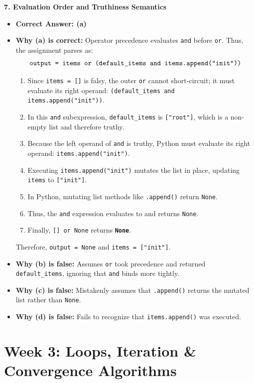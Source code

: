 \textbf{7. Evaluation Order and Truthiness Semantics}
\begin{itemize}
    \item \textbf{Correct Answer: (a)}
    \item \textbf{Why (a) is correct:}
    Operator precedence evaluates \texttt{and} before \texttt{or}. Thus, the assignment parses as:
    \begin{equation*}
    \text{\texttt{output = items or (default\_items and items.append("init"))}}
    \end{equation*}
    \begin{enumerate}
        \item Since \texttt{items = []} is falsy, the outer \texttt{or} cannot short-circuit; it must evaluate its right operand: \texttt{(default\_items and items.append("init"))}.
        \item In this \texttt{and} subexpression, \texttt{default\_items} is \texttt{["root"]}, which is a non-empty list and therefore truthy.
        \item Because the left operand of \texttt{and} is truthy, Python must evaluate its right operand: \texttt{items.append("init")}.
        \item Executing \texttt{items.append("init")} mutates the list in place, updating \texttt{items} to \texttt{["init"]}.
        \item In Python, mutating list methods like \texttt{.append()} return \texttt{None}.
        \item Thus, the \texttt{and} expression evaluates to and returns \texttt{None}.
        \item Finally, \texttt{[] or None} returns \textbf{\texttt{None}}.
    \end{enumerate}
    Therefore, \texttt{output = None} and \texttt{items = ["init"]}.
    \item \textbf{Why (b) is false:} Assumes \texttt{or} took precedence and returned \texttt{default\_items}, ignoring that \texttt{and} binds more tightly.
    \item \textbf{Why (c) is false:} Mistakenly assumes that \texttt{.append()} returns the mutated list rather than \texttt{None}.
    \item \textbf{Why (d) is false:} Fails to recognize that \texttt{items.append()} was executed.
\end{itemize}

\section*{Week 3: Loops, Iteration \& Convergence Algorithms}

